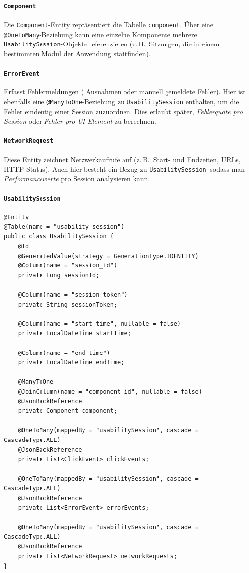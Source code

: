 \documentclass[12pt,oneside]{article}
\begin{document}
\paragraph{\lstinline|Component|}
Die \lstinline|Component|-Entity repräsentiert die Tabelle \texttt{component}. Über eine \lstinline|@OneToMany|-Beziehung kann eine einzelne Komponente mehrere \lstinline|UsabilitySession|-Objekte referenzieren (z.\,B.\ Sitzungen, die in einem bestimmten Modul der Anwendung stattfinden).

\paragraph{\lstinline|ErrorEvent|}
Erfasst Fehlermeldungen ( Ausnahmen oder manuell gemeldete Fehler). Hier ist ebenfalls eine \lstinline|@ManyToOne|-Beziehung zu \lstinline|UsabilitySession| enthalten, um die Fehler eindeutig einer Session zuzuordnen. Dies erlaubt später, \emph{Fehlerquote pro Session} oder \emph{Fehler pro UI-Element} zu berechnen.

\paragraph{\lstinline|NetworkRequest|}
Diese Entity zeichnet Netzwerkaufrufe auf (z.\,B.\ Start- und Endzeiten, URLs, HTTP-Status). Auch hier besteht ein Bezug zu \lstinline|UsabilitySession|, sodass man \emph{Performancewerte} pro Session analysieren kann.

\paragraph{\lstinline|UsabilitySession|}
\lstset{style=java}
\begin{lstlisting}
@Entity
@Table(name = "usability_session")
public class UsabilitySession {
    @Id
    @GeneratedValue(strategy = GenerationType.IDENTITY)
    @Column(name = "session_id")
    private Long sessionId;

    @Column(name = "session_token")
    private String sessionToken;

    @Column(name = "start_time", nullable = false)
    private LocalDateTime startTime;

    @Column(name = "end_time")
    private LocalDateTime endTime;

    @ManyToOne
    @JoinColumn(name = "component_id", nullable = false)
    @JsonBackReference
    private Component component;

    @OneToMany(mappedBy = "usabilitySession", cascade = CascadeType.ALL)
    @JsonBackReference
    private List<ClickEvent> clickEvents;

    @OneToMany(mappedBy = "usabilitySession", cascade = CascadeType.ALL)
    @JsonBackReference
    private List<ErrorEvent> errorEvents;

    @OneToMany(mappedBy = "usabilitySession", cascade = CascadeType.ALL)
    @JsonBackReference
    private List<NetworkRequest> networkRequests;
}
\end{lstlisting}
\end{document}
